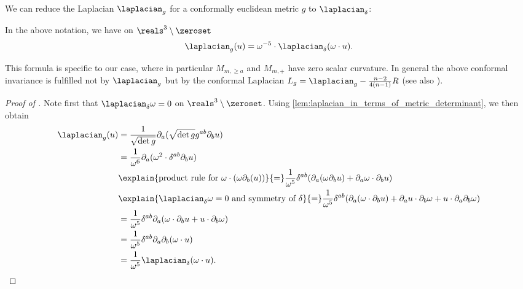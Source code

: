 \documentclass[titlepage,numbers=noenddot,oneside,%
cleardoublepage=empty,paper=a4,fontsize=11pt,%
english,%
]{scrartcl}
\begin{document}
We can reduce the Laplacian \( \laplacian_g \) for a conformally euclidean metric \( g \) to \( \laplacian_{\delta} \):
\begin{lemma}\label{lem:laplacian_on_schwarzschild}
    In the above notation, we have on \( \reals^3\setminus \zeroset \)
    \begin{equation*}
        \laplacian_g(u)=\omega^{-5}\cdot \laplacian_\delta(\omega \cdot u).
    \end{equation*}
\end{lemma}
\begin{remark}
    This formula is specific to our case, where in particular \( M_{m,\geq a} \) and \( M_{m,+} \) have zero scalar curvature. In general the above conformal invariance is fulfilled not by \( \laplacian_g \) but by the conformal Laplacian \( L_g=\laplacian_g-\frac{n-2}{4(n-1)}R \) (see also \cite[Definition 3]{curryIntroductionConformalGeometry2015}).
\end{remark}
\begin{proof}[Proof of ]
    Note first that \( \laplacian_\delta \omega=0 \) on \( \reals^3\setminus \zeroset \). Using \cref{lem:laplacian_in_terms_of_metric_determinant}, we then obtain
    \begin{equation*}
        \begin{aligned}[t]
            \laplacian_g(u)\begin{aligned}[t]
                &=\frac{1}{\sqrt{\det{g}}}\partial_a(\sqrt{\det{g}}g^{ab}\partial_b u)\\
                &=\frac{1}{\omega^6}\partial_a(\omega^{2}\cdot \delta^{ab} \partial_b u)\\
                &\explain{\text{product rule for \( \omega\cdot (\omega \partial_b(u)) \)}}{=}\frac{1}{\omega^5}\delta^{ab}(\partial_a(\omega \partial_b u)+\partial_a \omega\cdot \partial_b u)\\
                &\explain{\text{\( \laplacian_\delta \omega=0 \) and symmetry of \( \delta \)}}{=}\frac{1}{\omega^5}\delta^{ab}(\partial_a(\omega\cdot \partial_b u)+\partial_a u\cdot \partial_b \omega+u\cdot \partial_a \partial_b \omega)\\
                &=\frac{1}{\omega^5}\delta^{ab}\partial_a(\omega\cdot \partial_b u +u\cdot \partial_b \omega)\\
                &=\frac{1}{\omega^5}\delta^{ab}\partial_a  \partial_b(\omega\cdot u)\\
                &=\frac{1}{\omega^5}\laplacian_\delta(\omega\cdot u).
            \end{aligned}
        \end{aligned}
    \end{equation*}
\end{proof}
\end{document}
